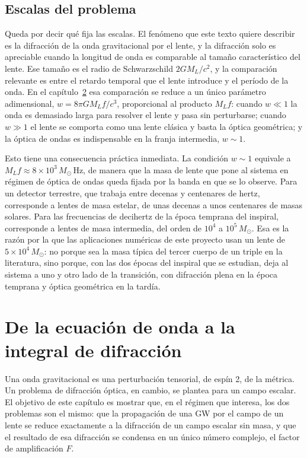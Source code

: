 \documentclass[11pt,a4paper,openany]{book}
\newcommand{\Msun}{M_{\odot}}
\begin{document}
\section{Escalas del problema}
\label{sec:escalas}

Queda por decir qu\'e fija las escalas. El fen\'omeno que este texto quiere
describir es la difracci\'on de la onda gravitacional por el lente, y la
difracci\'on solo es apreciable cuando la longitud de onda es comparable al
tama\~no caracter\'istico del lente. Ese tama\~no es el radio de Schwarzschild
$2GM_L/c^{2}$, y la comparaci\'on relevante es entre el retardo temporal que
el lente introduce y el per\'iodo de la onda. En el
cap\'itulo~\ref{ch:scalar} esa comparaci\'on se reduce a un \'unico
par\'ametro adimensional, $w=8\pi GM_Lf/c^{3}$, proporcional al producto
$M_Lf$: cuando $w\ll1$ la onda es demasiado larga para resolver el lente y
pasa sin perturbarse; cuando $w\gg1$ el lente se comporta como una lente
cl\'asica y basta la \'optica geom\'etrica; y la \'optica de ondas es
indispensable en la franja intermedia, $w\sim1$.

Esto tiene una consecuencia pr\'actica inmediata. La condici\'on $w\sim1$
equivale a $M_Lf\approx8\times10^{3}\,\Msun\,$Hz, de manera que la masa de
lente que pone al sistema en r\'egimen de \'optica de ondas queda fijada por
la banda en que se lo observe. Para un detector terrestre, que trabaja entre
decenas y centenares de hertz, corresponde a lentes de masa estelar, de unas
decenas a unos centenares de masas solares. Para las frecuencias de
decihertz de la \'epoca temprana del inspiral, corresponde a lentes de masa
intermedia, del orden de $10^{4}$ a $10^{5}\,\Msun$. Esa es la raz\'on por la
que las aplicaciones num\'ericas de este proyecto usan un lente de
$5\times10^{4}\,\Msun$: no porque sea la masa t\'ipica del tercer cuerpo de un
triple en la literatura, sino porque, con las dos \'epocas del inspiral que se
estudian, deja al sistema a uno y otro lado de la transici\'on, con
difracci\'on plena en la \'epoca temprana y \'optica geom\'etrica en la
tard\'ia.

\chapter{De la ecuaci\'on de onda a la integral de difracci\'on}
\label{ch:scalar}

Una onda gravitacional es una perturbaci\'on tensorial, de esp\'in 2, de la
m\'etrica. Un problema de difracci\'on \'optica, en cambio, se plantea para un
campo escalar. El objetivo de este cap\'itulo es mostrar que, en el r\'egimen
que interesa, los dos problemas son el mismo: que la propagaci\'on de una GW
por el campo de un lente se reduce exactamente a la difracci\'on de un campo
escalar sin masa, y que el resultado de esa difracci\'on se condensa en un
\'unico n\'umero complejo, el factor de amplificaci\'on $F$.
\end{document}
